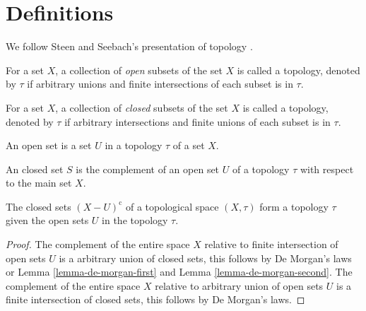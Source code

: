 \section{Definitions}

We follow Steen and Seebach's presentation of topology \cite{Steen1995}.

\begin{definition}
	\label{definition-topology-open-sets}
	For a set $X$, a collection of \textit{open} subsets 
	of the set $X$ is called a topology, denoted by $\tau$ 
	if arbitrary unions and finite intersections of each subset
	is in $\tau$.
\end{definition}

\begin{definition}
	\label{definition-topology-closed-sets}
	For a set $X$, a collection of \textit{closed} subsets 
	of the set $X$ is called a topology, denoted by $\tau$ 
	if arbitrary intersections and finite unions of each subset
	is in $\tau$.
\end{definition}

\begin{definition}
	\label{definition-open-set}
	An open set is a set $U$ in a topology $\tau$ of a set $X$.
\end{definition}

\begin{definition}
	\label{definition-closed-set}
	An closed set $S$ is the complement of an open set $U$ 
	of a topology $\tau$ with respect to the main set $X$.
\end{definition}

\begin{lemma}
	The closed sets $(X - U)^\mathrm{c}$ 
	of a topological space $(X, \tau)$ form
	a topology $\tau$ given the open sets $U$ in the topology $\tau$.
\end{lemma}

\begin{proof}
	The complement of the entire space $X$ relative to finite intersection of open sets $U$
	is a arbitrary union of closed sets, this follows by De Morgan's laws or Lemma \ref{lemma-de-morgan-first} and Lemma \ref{lemma-de-morgan-second}.
	The complement of the entire space $X$ relative to arbitrary union of open sets $U$
	is a finite intersection of closed sets, this follows by De Morgan's laws.
\end{proof}

